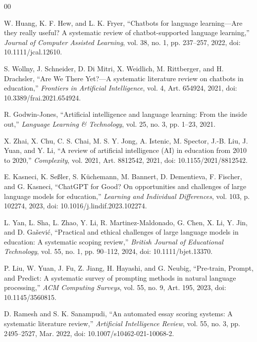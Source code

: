 \documentclass[conference]{IEEEtran}
\begin{document}
\begin{thebibliography}{00}

W. Huang, K. F. Hew, and L. K. Fryer, ``Chatbots for language learning---Are they really useful? A systematic review of chatbot-supported language learning,'' \textit{Journal of Computer Assisted Learning}, vol. 38, no. 1, pp. 237--257, 2022, doi: 10.1111/jcal.12610.

S. Wollny, J. Schneider, D. Di Mitri, X. Weidlich, M. Rittberger, and H. Drachsler, ``Are We There Yet?---A systematic literature review on chatbots in education,'' \textit{Frontiers in Artificial Intelligence}, vol. 4, Art. 654924, 2021, doi: 10.3389/frai.2021.654924.

R. Godwin-Jones, ``Artificial intelligence and language learning: From the inside out,'' \textit{Language Learning \& Technology}, vol. 25, no. 3, pp. 1--23, 2021.

X. Zhai, X. Chu, C. S. Chai, M. S. Y. Jong, A. Istenic, M. Spector, J.-B. Liu, J. Yuan, and Y. Li, ``A review of artificial intelligence (AI) in education from 2010 to 2020,'' \textit{Complexity}, vol. 2021, Art. 8812542, 2021, doi: 10.1155/2021/8812542.

E. Kasneci, K. Se\ss{}ler, S. K\"uchemann, M. Bannert, D. Dementieva, F. Fischer, and G. Kasneci, ``ChatGPT for Good? On opportunities and challenges of large language models for education,'' \textit{Learning and Individual Differences}, vol. 103, p. 102274, 2023, doi: 10.1016/j.lindif.2023.102274.

L. Yan, L. Sha, L. Zhao, Y. Li, R. Martinez-Maldonado, G. Chen, X. Li, Y. Jin, and D. Ga\v{s}evi\'{c}, ``Practical and ethical challenges of large language models in education: A systematic scoping review,'' \textit{British Journal of Educational Technology}, vol. 55, no. 1, pp. 90--112, 2024, doi: 10.1111/bjet.13370.

P. Liu, W. Yuan, J. Fu, Z. Jiang, H. Hayashi, and G. Neubig, ``Pre-train, Prompt, and Predict: A systematic survey of prompting methods in natural language processing,'' \textit{ACM Computing Surveys}, vol. 55, no. 9, Art. 195, 2023, doi: 10.1145/3560815.

D. Ramesh and S. K. Sanampudi, ``An automated essay scoring systems: A systematic literature review,'' \textit{Artificial Intelligence Review}, vol. 55, no. 3, pp. 2495--2527, Mar. 2022, doi: 10.1007/s10462-021-10068-2.


\end{thebibliography}
\end{document}
